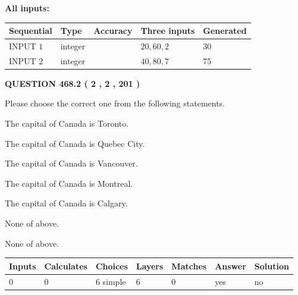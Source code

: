 \documentclass[12pt]{article}
\begin{document}
   
   
   
\noindent\vspace{0.1in}\hspace{-0.08in} {\textbf{\Large{All inputs: }}}
   
   
  
  
\noindent\begin{tabular}{|l|l|l|l|l|}
\hline
 Sequential & Type & Accuracy & Three inputs & Generated \\ 
\hline
 
 
  INPUT $  1 $ & integer &  & $
 20
 , 
 60
 , 
 2
 $ & $ 30 $ 
 \\  \hline  
 
 
  INPUT $  2 $ & integer &  & $
 40
 , 
 80
 , 
 7
 $ & $ 75 $ 
 \\  \hline  
 \end{tabular}
   
   
  
\vspace{0.2in}
  
{\textbf{\Large{QUESTION
468.2 
 ( 2 , 2 , 201 )
}}}
  
  
Please choose the correct one from the following statements.
 
 
The capital of Canada is Toronto.
 
 
The capital of Canada is Quebec City.
 
 
The capital of Canada is Vancouver.
 
 
The capital of Canada is Montreal.
 
 
The capital of Canada is Calgary.
 
 
 None of above.
 
 
\noindent{}
 
 
 None of above.
 
 
\noindent{}
 
 
   
   
   
   
\noindent\begin{tabular}{|l|l|l|l|l|l|l|}
 \hline
Inputs & Calculates & Choices & Layers & Matches & Answer & Solution \\ \hline
 0  & 
 0  & 
 6
  simple  
  & 
 6  & 
 0  & 
  yes & 
  no 
  \\ \hline
 \end{tabular}
   
\end{document}
